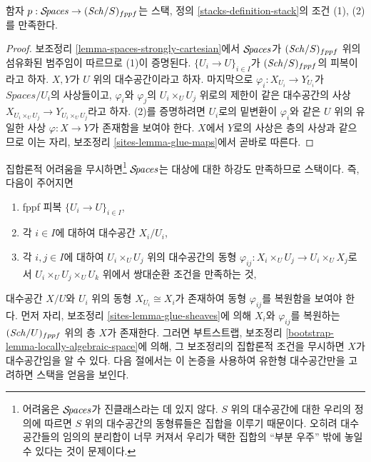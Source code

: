 \begin{lemma}
\label{lemma-pre-stack-of-spaces}
함자 $p : \mathcal{S}\!\mathit{paces} \to (\mathit{Sch}/S)_{fppf}$는 스택, 정의
\ref{stacks-definition-stack}의 조건 (1), (2)를 만족한다.
\end{lemma}

\begin{proof}
보조정리 \ref{lemma-spaces-strongly-cartesian}에서 $\mathcal{S}\!\mathit{paces}$가
$(\mathit{Sch}/S)_{fppf}$ 위의 섬유화된 범주임이 따르므로 (1)이 증명된다.
$\{U_i \to U\}_{i \in I}$가 $(\mathit{Sch}/S)_{fppf}$의 피복이라고 하자.
$X, Y$가 $U$ 위의 대수공간이라고 하자. 마지막으로
$\varphi_i : X_{U_i} \to Y_{U_i}$가 $\textit{Spaces}/U_i$의 사상들이고,
$\varphi_i$와 $\varphi_j$의 $U_i \times_U U_j$ 위로의 제한이 같은
대수공간의 사상 $X_{U_i \times_U U_j} \to Y_{U_i \times_U U_j}$라고 하자.
(2)를 증명하려면 $U_i$로의 밑변환이 $\varphi_i$와 같은 $U$ 위의 유일한
사상 $\varphi  : X \to Y$가 존재함을 보여야 한다. $X$에서 $Y$로의
사상은 층의 사상과 같으므로 이는 자리, 보조정리
\ref{sites-lemma-glue-maps}에서 곧바로 따른다.
\end{proof}

\begin{remark}
\label{remark-stack-spaces}
집합론적 어려움을 무시하면\footnote{어려움은 $\mathcal{S}\!\mathit{paces}$가 진클래스라는
데 있지 않다. $S$ 위의 대수공간에 대한 우리의 정의에 따르면 $S$ 위의
대수공간의 동형류들은 집합을 이루기 때문이다. 오히려 대수공간들의 임의의
분리합이 너무 커져서 우리가 택한 집합의 ``부분 우주'' 밖에 놓일 수 있다는
것이 문제이다.} $\mathcal{S}\!\mathit{paces}$는 대상에 대한 하강도 만족하므로 스택이다.
즉, 다음이 주어지면
\begin{enumerate}
\item fppf 피복 $\{U_i \to U\}_{i \in I}$,
\item 각 $i \in I$에 대하여 대수공간 $X_i/U_i$,
\item 각 $i, j \in I$에 대하여 $U_i \times_U U_j$ 위의 대수공간의 동형
$\varphi_{ij} : X_i \times_U U_j \to U_i \times_U X_j$로서
$U_i \times_U U_j \times_U U_k$ 위에서 쌍대순환 조건을 만족하는 것,
\end{enumerate}
대수공간 $X/U$와 $U_i$ 위의 동형 $X_{U_i} \cong X_i$가 존재하여 동형
$\varphi_{ij}$를 복원함을 보여야 한다. 먼저 자리, 보조정리
\ref{sites-lemma-glue-sheaves}에 의해 $X_i$와 $\varphi_{ij}$를 복원하는
$(\mathit{Sch}/U)_{fppf}$ 위의 층 $X$가 존재한다. 그러면 부트스트랩, 보조정리
\ref{bootstrap-lemma-locally-algebraic-space}에 의해, 그 보조정리의 집합론적
조건을 무시하면 $X$가 대수공간임을 알 수 있다. 다음 절에서는 이 논증을
사용하여 유한형 대수공간만을 고려하면 스택을 얻음을 보인다.
\end{remark}






